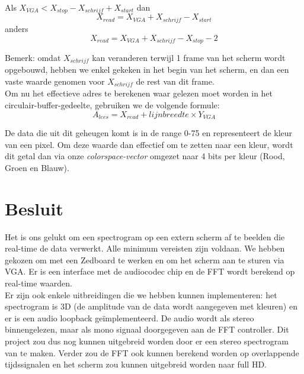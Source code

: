 \documentclass[a4paper,kul]{kulakarticle} %
\begin{document}
\begin{itemize}
	Als $X_{VGA} < X_{stop} - X_{schrijf} + X_{start}$ dan 
	$$X_{read} = X_{VGA} + X_{schrijf} - X_{start}$$
	anders
	$$X_{read} = X_{VGA} + X_{schrijf} - X_{stop} - 2$$
	
	
	Bemerk: omdat $X_{schrijf}$ kan veranderen terwijl 1 frame van het scherm wordt opgebouwd, hebben we enkel gekeken in het begin van het scherm, en dan een vaste waarde genomen voor $X_{schrijf}$ de rest van dit frame.\\
	Om nu het effectieve adres te berekenen waar gelezen moet worden in het circulair-buffer-gedeelte, gebruiken we de volgende formule:
	$$ A_{lees} = X_{read} + lijnbreedte \times Y_{VGA} $$
	
	De data die uit dit geheugen komt is in de range 0-75 en representeert de kleur van een pixel. Om deze waarde dan effectief om te zetten naar een kleur, wordt dit getal dan via onze \textit{colorspace-vector} omgezet naar 4 bits per kleur (Rood, Groen en Blauw).

\end{itemize}

\section{Besluit}

Het is ons gelukt om een spectrogram op een extern scherm af te beelden die real-time de data verwerkt. Alle minimum vereisten zijn voldaan. We hebben gekozen om met een Zedboard te werken en om het scherm aan te sturen via VGA. Er is een interface met de audiocodec chip en de FFT wordt berekend op real-time waarden.\\

Er zijn ook enkele uitbreidingen die we hebben kunnen implementeren: het spectrogram is 3D (de amplitude van de data wordt aangegeven met kleuren) en er is een audio loopback geïmplementeerd. De audio wordt als stereo binnengelezen, maar als mono signaal doorgegeven aan de FFT controller. Dit project zou dus nog kunnen uitgebreid worden door er een stereo spectrogram van te maken. Verder zou de FFT ook kunnen berekend worden op overlappende tijdssignalen en het scherm zou kunnen uitgebreid worden naar full HD.\\
\end{document}
